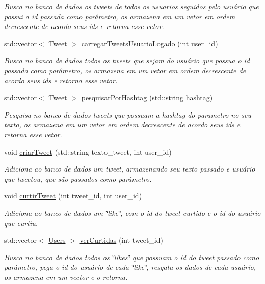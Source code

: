 \begin{DoxyCompactItemize}
\begin{DoxyCompactList}\small\item\em Busca no banco de dados os tweets de todos os usuarios seguidos pelo usuário que possui a id passada como parâmetro, os armazena em um vetor em ordem decrescente de acordo seus id\textquotesingle{}s e retorna esse vetor. \end{DoxyCompactList}\item 
std\+::vector$<$ \hyperlink{class_t_a_d_1_1_tweet}{Tweet} $>$ \hyperlink{class_t_a_d_1_1_tweet_a94baf61ace95f86f1da485d35eaee8af}{carregar\+Tweets\+Usuario\+Logado} (int user\+\_\+id)
\begin{DoxyCompactList}\small\item\em Busca no banco de dados todos os tweets que sejam do usuário que possua o id passado como parâmetro, os armazena em um vetor em ordem decrescente de acordo seus id\textquotesingle{}s e retorna esse vetor. \end{DoxyCompactList}\item 
std\+::vector$<$ \hyperlink{class_t_a_d_1_1_tweet}{Tweet} $>$ \hyperlink{class_t_a_d_1_1_tweet_ad749e73f643150bbf4f4b20a43b0ff0c}{pesquisar\+Por\+Hashtag} (std\+::string hashtag)
\begin{DoxyCompactList}\small\item\em Pesquisa no banco de dados tweets que possuam a hashtag do parametro no seu texto, os armazena em um vetor em ordem decrescente de acordo seus id\textquotesingle{}s e retorna esse vetor. \end{DoxyCompactList}\item 
void \hyperlink{class_t_a_d_1_1_tweet_a9970f889481d1f565d042dd6644931a3}{criar\+Tweet} (std\+::string texto\+\_\+tweet, int user\+\_\+id)
\begin{DoxyCompactList}\small\item\em Adiciona ao banco de dados um tweet, armazenando seu texto passado e usuário que tweetou, que são passados como parâmetro. \end{DoxyCompactList}\item 
void \hyperlink{class_t_a_d_1_1_tweet_a3c877225ed50649b8513fffa8ed2af39}{curtir\+Tweet} (int tweet\+\_\+id, int user\+\_\+id)
\begin{DoxyCompactList}\small\item\em Adiciona ao banco de dados um \char`\"{}like\char`\"{}, com o id do tweet curtido e o id do usuário que curtiu. \end{DoxyCompactList}\item 
std\+::vector$<$ \hyperlink{class_t_a_d_1_1_users}{Users} $>$ \hyperlink{class_t_a_d_1_1_tweet_a6e5abea7662510af5063bbbea3feea7e}{ver\+Curtidas} (int tweet\+\_\+id)
\begin{DoxyCompactList}\small\item\em Busca no banco de dados todos os \char`\"{}likes\char`\"{} que possuam o id do tweet passado como parâmetro, pega o id do usuário de cada \char`\"{}like\char`\"{}, resgata os dados de cada usuário, os armazena em um vector e o retorna. \end{DoxyCompactList}\end{DoxyCompactItemize}
